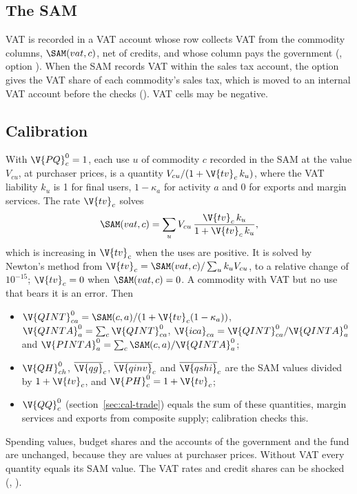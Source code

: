 \subsection{The SAM}

VAT is recorded in a VAT account whose row collects VAT from the commodity
columns, $\SAM(vat, c)$, net of credits, and whose column pays the government
(, option ). When the SAM records VAT within the
sales tax account, the option  gives the VAT share of each
commodity's sales tax, which is moved to an internal VAT account before the
checks (). VAT cells may be negative.

\subsection{Calibration}

With $\V{PQ}^0_c = 1$, each use $u$ of commodity $c$ recorded in the SAM at the
value $V_{cu}$, at purchaser prices, is a quantity $V_{cu}/(1 + \V{tv}_c\,k_u)$,
where the VAT liability $k_u$ is 1 for final users, $1 - \kappa_a$ for
activity $a$ and 0 for exports and margin services. The rate $\V{tv}_c$ solves
\begin{equation*}
\SAM(vat, c) = \sum_u V_{cu}\,\frac{\V{tv}_c\,k_u}{1 + \V{tv}_c\,k_u},
\end{equation*}
which is increasing in $\V{tv}_c$ when the uses are positive. It is solved by
Newton's method from $\V{tv}_c = \SAM(vat, c) / \sum_u k_u V_{cu}$, to a
relative change of $10^{-15}$; $\V{tv}_c = 0$ when $\SAM(vat, c) = 0$. A
commodity with VAT but no use that bears it is an error. Then
\begin{itemize}
\item $\V{QINT}^0_{ca} = \SAM(c, a) / (1 + \V{tv}_c(1 - \kappa_a))$,
$\V{QINTA}^0_a = \sum_c \V{QINT}^0_{ca}$, $\V{ica}_{ca} = \V{QINT}^0_{ca} / \V{QINTA}^0_a$
and $\V{PINTA}^0_a = \sum_c \SAM(c, a) / \V{QINTA}^0_a$;
\item $\V{QH}^0_{ch}$, $\overline{\V{qg}}_c$, $\overline{\V{qinv}}_c$ and
$\overline{\V{qshi}}_c$ are the SAM values divided by $1 + \V{tv}_c$, and
$\V{PH}^0_c = 1 + \V{tv}_c$;
\item $\V{QQ}^0_c$ (section~\ref{sec:cal-trade}) equals the sum of these
quantities, margin services and exports from composite supply; calibration
checks this.
\end{itemize}
Spending values, budget shares and the accounts of the government and the
fund are unchanged, because they are values at purchaser prices. Without VAT
every quantity equals its SAM value. The VAT rates and credit shares can be
shocked (, ).

